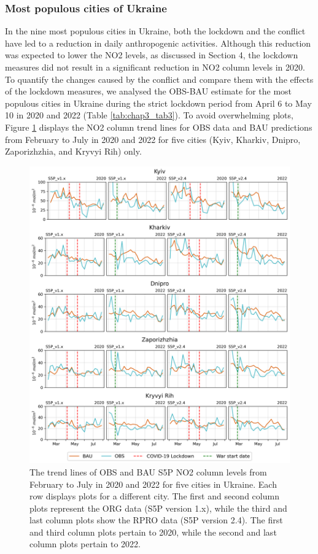 \subsubsection*{Most populous cities of Ukraine}
In the nine most populous cities in Ukraine, both the lockdown and the conflict have led to a reduction in daily anthropogenic activities. Although this reduction was expected to lower the NO2 levels, as discussed in Section 4, the lockdown measures did not result in a significant reduction in NO2 column levels in 2020. To quantify the changes caused by the conflict and compare them with the effects of the lockdown measures, we analysed the OBS-BAU estimate for the most populous cities in Ukraine during the strict lockdown period from April 6 to May 10 in 2020 and 2022 (Table \ref{tab:chap3_tab3}). To avoid overwhelming plots, Figure \ref{fig:chap3_fig8} displays the NO2 column trend lines for OBS data and BAU predictions from February to July in 2020 and 2022 for five cities (Kyiv, Kharkiv, Dnipro, Zaporizhzhia, and Kryvyi Rih) only.\par
\begin{figure}
    \centering
    \includegraphics[width=\textwidth]{figs/chap3/fig8.png}
    \caption[OBS and BAU S5P NO2 trends (2020-2022) in populous cities]{The trend lines of OBS and BAU S5P NO2 column levels from February to July in 2020 and 2022 for five cities in Ukraine. Each row displays plots for a different city. The first and second column plots represent the ORG data (S5P version 1.x), while the third and last column plots show the RPRO data (S5P version 2.4). The first and third column plots pertain to 2020, while the second and last column plots pertain to 2022.}
    \label{fig:chap3_fig8}
\end{figure}


